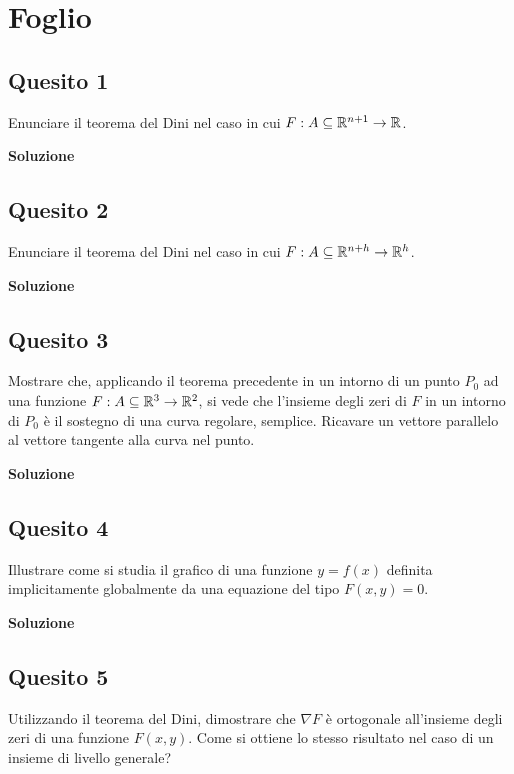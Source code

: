 \chapter{Foglio \ \thechapter}


\section*{Quesito 1}
Enunciare il teorema del Dini nel caso in cui $F:A\subseteq \mathbb{R}^{n+1}\to\mathbb{R}$.

\medskip
\begin{large}
\textbf{Soluzione}
\end{large}


\section*{Quesito 2}
Enunciare il teorema del Dini nel caso in cui $F:A\subseteq \mathbb{R}^{n+h}\to\mathbb{R}^h$.


\medskip
\begin{large}
\textbf{Soluzione}
\end{large}


\section*{Quesito 3}
Mostrare che, applicando il teorema precedente in un intorno di un punto $P_0$
ad una funzione $F:A\subseteq \mathbb{R}^3\to\mathbb{R}^2$, si vede che l’insieme degli zeri di
$F$ in un intorno di $P_0$ è il sostegno di una curva regolare, semplice. Ricavare un vettore parallelo al vettore
tangente alla curva nel punto.


\medskip
\begin{large}
\textbf{Soluzione}
\end{large}


\section*{Quesito 4}
Illustrare come si studia il grafico di una funzione $y = f(x)$ definita implicitamente globalmente da una equazione del tipo $F(x, y) = 0$.


\medskip
\begin{large}
\textbf{Soluzione}
\end{large}


\section*{Quesito 5}
Utilizzando il teorema del Dini, dimostrare che $\nabla F$ è ortogonale all’insieme
degli zeri di una funzione $F(x, y)$. Come si ottiene lo stesso risultato nel caso di un insieme
di livello generale?


